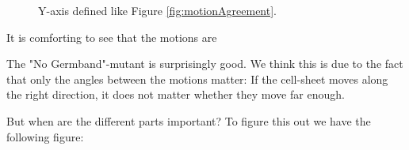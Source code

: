 \begin{figure}[H]
    \centering
    \caption{ Y-axis defined like Figure \ref{fig:motionAgreement}. }
    \label{fig:compare-motionAgreement}
\end{figure}
It is comforting to see that the motions are 

The "No Germband"-mutant is surprisingly good. We think this is due to the fact that only the angles between the motions matter: If the cell-sheet moves along the right direction, it does not matter whether they move far enough.   

But when are the different parts important? To figure this out we have the following figure:

